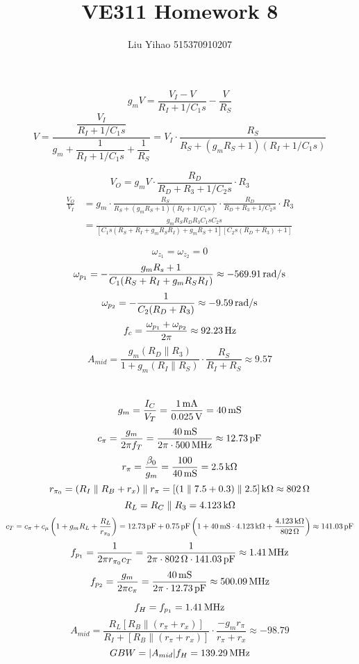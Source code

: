 \documentclass{article}
\title{VE311 Homework 8}
\author{Liu Yihao 515370910207}
\date{}
\newcommand{\unit}[1]{{\rm\,#1}}
\begin{document}
\maketitle

\section{}
$$g_mV=\frac{V_I-V}{R_I+1/C_1s}-\frac{V}{R_S}$$
$$V=\frac{\dfrac{V_I}{R_I+1/C_1s}}{g_m+\dfrac{1}{R_I+1/C_1s}+\dfrac{1}{R_S}}=V_I\cdot\frac{R_S}{R_S+(g_mR_S+1)(R_I+1/C_1s)}$$

$$V_O=g_mV\cdot\frac{R_D}{R_D+R_3+1/C_2s}\cdot R_3$$
\begin{align*}
\frac{V_O}{V_I}&=g_m\cdot\frac{R_S}{R_S+(g_mR_S+1)(R_I+1/C_1s)}\cdot\frac{R_D}{R_D+R_3+1/C_2s}\cdot R_3\\
&=\frac{g_mR_SR_DR_3C_1sC_2s}{[C_1s(R_S+R_I+g_mR_SR_I)+g_mR_S+1][C_2s(R_D+R_3)+1]}
\end{align*}

$$\omega_{z_1}=\omega_{z_2}=0$$
$$\omega_{p_1}=-\frac{g_mR_s+1}{C_1(R_S+R_I+g_mR_SR_I)}\approx-569.91\unit{rad/s}$$
$$\omega_{p_2}=-\frac{1}{C_2(R_D+R_3)}\approx-9.59\unit{rad/s}$$
$$f_c=\frac{\omega_{p_1}+\omega_{p_2}}{2\pi}\approx92.23\unit{Hz}$$
$$A_{mid}=\frac{g_m(R_D\parallel R_3)}{1+g_m(R_I\parallel R_S)}\cdot\frac{R_S}{R_I+R_S}\approx9.57$$

\section{}
$$g_m=\frac{I_C}{V_T}=\frac{1\unit{mA}}{0.025\unit{V}}=40\unit{mS}$$
$$c_\pi=\frac{g_m}{2\pi f_T}=\frac{40\unit{mS}}{2\pi\cdot500\unit{MHz}}\approx12.73\unit{pF}$$
$$r_\pi=\frac{\beta_0}{g_m}=\frac{100}{40\unit{mS}}=2.5\unit{k\Omega}$$
$$r_{\pi_0}=(R_I\parallel R_B+r_x)\parallel r_\pi=[(1\parallel7.5+0.3)\parallel 2.5]\unit{k\Omega}\approx802\unit{\Omega}$$
$$R_L=R_C\parallel R_3=4.123\unit{k\Omega}$$
$$c_T=c_\pi+c_\mu\left(1+g_mR_L+\frac{R_L}{r_{\pi_0}}\right)=12.73\unit{pF}+0.75\unit{pF}\left(1+40\unit{mS}\cdot4.123\unit{k\Omega}+\frac{4.123\unit{k\Omega}}{802\unit{\Omega}}\right)\approx141.03\unit{pF}$$
$$f_{p_1}=\frac{1}{2\pi r_{\pi_0}c_T}=\frac{1}{2\pi\cdot802\unit{\Omega}\cdot141.03\unit{pF}}\approx1.41\unit{MHz}$$
$$f_{p_2}=\frac{g_m}{2\pi c_\pi}=\frac{40\unit{mS}}{2\pi\cdot12.73\unit{pF}}\approx500.09\unit{MHz}$$

$$f_H=f_{p_1}=1.41\unit{MHz}$$
$$A_{mid}=\frac{R_L[R_B\parallel(r_\pi+r_x)]}{R_I+[R_B\parallel(r_\pi+r_x)]}\cdot\frac{-g_mr_\pi}{r_\pi+r_x}\approx-98.79$$
$$GBW=|A_{mid}|f_H=139.29\unit{MHz}$$
\end{document}

